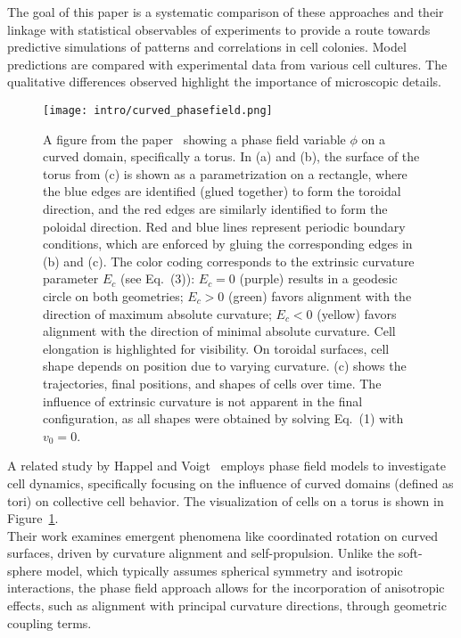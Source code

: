 The goal of this paper is a systematic comparison of these approaches and their linkage with statistical observables of experiments to provide a route towards predictive simulations of patterns and correlations in cell colonies. 
Model predictions are compared with experimental data from various cell cultures. 
The qualitative differences observed highlight the importance of microscopic details. \\ 
\begin{figure}[h!]
	\centering
	\texttt{[image: intro/curved\_phasefield.png]}
	\caption{A figure from the paper~\cite{Happel2023} showing a phase field variable $\phi$ on a curved domain, specifically a torus. 
	In (a) and (b), the surface of the torus from (c) is shown as a parametrization on a rectangle, where the blue edges are identified (glued together) to form the toroidal direction, and the red edges are similarly identified to form the poloidal direction. 
	Red and blue lines represent periodic boundary conditions, which are enforced by gluing the corresponding edges in (b) and (c).
	The color coding corresponds to the extrinsic curvature parameter $E_c$ (see Eq.~(3)): $E_c = 0$ (purple) results in a geodesic circle on both geometries; $E_c > 0$ (green) favors alignment with the direction of maximum absolute curvature; $E_c < 0$ (yellow) favors alignment with the direction of minimal absolute curvature. 
	Cell elongation is highlighted for visibility. 
	On toroidal surfaces, cell shape depends on position due to varying curvature. 
	(c) shows the trajectories, final positions, and shapes of cells over time. 
	The influence of extrinsic curvature is not apparent in the final configuration, as all shapes were obtained by solving Eq.~(1) with $v_0 = 0$. 
	}
	\label{fig:curved_phasefield}
\end{figure}
A related study by Happel and Voigt~\cite{Happel2023} employs phase field models to investigate cell dynamics, specifically focusing on the influence of curved domains (defined as tori) on collective cell behavior. 
The visualization of cells on a torus is shown in Figure~\ref{fig:curved_phasefield}. \\ 
Their work examines emergent phenomena like coordinated rotation on curved surfaces, driven by curvature alignment and self-propulsion. 
Unlike the soft-sphere model, which typically assumes spherical symmetry and isotropic interactions, the phase field approach allows for the incorporation of anisotropic effects, such as alignment with principal curvature directions, through geometric coupling terms. 
